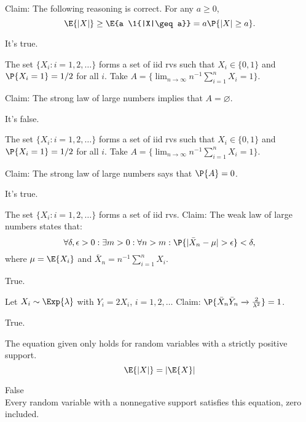 \documentclass[tf-tutorial-all.tex]{subfiles}
\begin{document}
\begin{truefalse}
Claim: The following reasoning is correct. For any $a\geq 0$,
\begin{equation}
\label{eq:8}
\E{|X|} \geq \E{a \1{|X|\geq a}} = a \P{|X| \geq a}.
\end{equation}

\begin{solution}
It's true.
\end{solution}
\end{truefalse}

\begin{truefalse}
The set $\{X_i : i = 1, 2, \ldots\}$ forms a set of iid rvs such that $X_i\in \{0, 1\}$ and $\P{X_i=1} = 1/2$ for all $i$.
Take $A=\{\lim_{n\to\infty} n^{-1}\sum_{i=1}^{n}X_i = 1\}$.

Claim: The strong law of large numbers implies that $A=\varnothing$.

\begin{solution}
It's false.
\end{solution}
\end{truefalse}

\begin{truefalse}
The set $\{X_i : i = 1, 2, \ldots\}$ forms a set of iid rvs such that $X_i\in \{0, 1\}$ and $\P{X_i=1} = 1/2$ for all $i$.
Take $A=\{\lim_{n\to\infty} n^{-1}\sum_{i=1}^{n}X_i = 1\}$.

Claim: The strong law of large numbers says that $\P{A} = 0$.

\begin{solution}
It's true.
\end{solution}
\end{truefalse}

\begin{truefalse}
The set $\{X_i : i = 1, 2, \ldots\}$ forms a set of iid rvs.
Claim: The weak law of large numbers states that:
\begin{equation}
\label{eq:9}
\forall \delta, \epsilon > 0: \exists m > 0 : \forall n > m: \P{|\bar X_{n}-\mu| > \epsilon} < \delta,
\end{equation}
where $\mu=\E{X_{i}}$ and $\bar X_n = n^{-1}\sum_{i=1}^{n}X_{i}$.
\begin{solution}
True.
\end{solution}
\end{truefalse}

\begin{truefalse}
Let $X_i \sim \Exp{\lambda}$ with $Y_i = 2X_i$, $i=1,2,\dots$ Claim: $\P{\bar{X}_n\bar{Y}_n \xrightarrow{} \frac{2}{\lambda^2}}=1$.

\begin{solution}
True.
\end{solution}
\end{truefalse}

\begin{truefalse}
The equation given only holds for random variables with a strictly positive support. 
\\$$\E{|X|} = |\E{X}| $$
\begin{solution}
False\\
Every random variable with a nonnegative support satisfies 
this equation, zero included.
\end{solution}
\end{truefalse}
\end{document}
